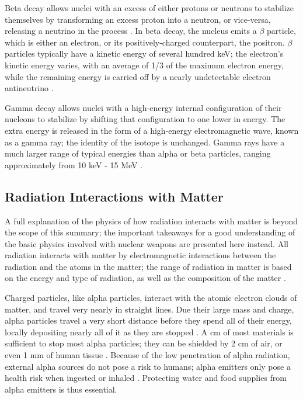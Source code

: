\documentclass{report}
\begin{document}
Beta decay allows nuclei with an excess of either protons or neutrons to stabilize themselves by transforming an excess proton into a neutron, or vice-versa, releasing a neutrino in the process \cite{krane1987introductory}. In beta decay,  the nucleus emits a \(\beta\) particle, which is either an electron, or its positively-charged counterpart, the positron. \(\beta\) particles typically have a kinetic energy of several hundred keV;   the electron's kinetic energy varies, with an average of 1/3 of the maximum electron energy, while the remaining energy is carried off by a nearly undetectable electron antineutrino \cite{krane1987introductory}.

Gamma decay allows nuclei with a high-energy internal configuration of their nucleons to stabilize by shifting that configuration to one lower in energy. The extra energy is released in the form of a high-energy electromagnetic wave, known as a gamma ray; the identity of the isotope is unchanged. Gamma rays have a much larger range of typical energies than alpha or beta particles, ranging approximately from 10 keV - 15 MeV  \cite{krane1987introductory}.  



\subsection{Radiation Interactions with Matter}

A full explanation of the physics of how radiation interacts with matter is beyond the scope of this summary; the important takeaways for a good understanding of the basic physics involved with nuclear weapons are presented here instead. All radiation interacts with matter by electromagnetic interactions between the radiation and the atoms in the matter; the range of radiation in matter is based on the energy and type of radiation, as well as the composition of the matter \cite{krane1987introductory}. 

Charged particles, like alpha particles, interact with the atomic electron clouds of matter, and travel very nearly in straight lines. Due their large mass and charge, alpha particles travel a very short distance before they spend all of their energy, locally depositing nearly all of it as they are stopped \cite{krane1987introductory}. A cm of most materials is sufficient to stop most alpha particles; they can be shielded by 2 cm of air, or even 1 mm of human tissue \cite{Cember2008}. Because of the low penetration of alpha radiation, external alpha sources do not pose a risk to humans; alpha emitters only pose a health risk when ingested or inhaled \cite{CentersforDiseaseControlandPrevention}.  Protecting water and food supplies from alpha emitters is thus essential. 
\end{document}
